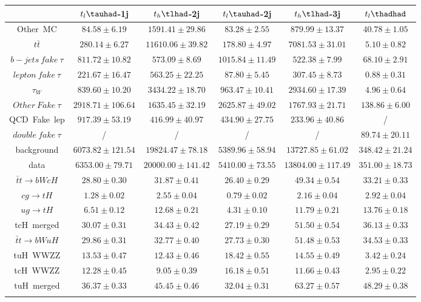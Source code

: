 \centering
\begin{tabular}{cccccc} \toprule\toprule
 & $t_{l}\tauhad$-1j & $t_{h}\tlhad$-2j & $t_{l}\tauhad$-2j & $t_{h}\tlhad$-3j & $t_{l}\thadhad$\\\midrule
Other~MC & $84.58\pm6.19$ & $1591.41\pm29.86$ & $83.28\pm2.55$ & $879.99\pm13.37$ & $40.78\pm1.05$\\
$t\bar{t}$ & $280.14\pm6.27$ & $11610.06\pm39.82$ & $178.80\pm4.97$ & $7081.53\pm31.01$ & $5.10\pm0.82$\\
$b-jets~fake~\tau$ & $811.72\pm10.82$ & $573.09\pm8.69$ & $1015.84\pm11.49$ & $522.38\pm7.99$ & $68.10\pm2.91$\\
$lepton~fake~\tau$ & $221.67\pm16.47$ & $563.25\pm22.25$ & $87.80\pm5.45$ & $307.45\pm8.73$ & $0.88\pm0.31$\\
$\tau_{W}$ & $839.60\pm10.20$ & $3434.22\pm18.70$ & $963.47\pm10.41$ & $2934.60\pm17.39$ & $4.96\pm0.64$\\
$Other~Fake~\tau$ & $2918.71\pm106.64$ & $1635.45\pm32.19$ & $2625.87\pm49.02$ & $1767.93\pm21.71$ & $138.86\pm6.00$\\
QCD~Fake~lep & $917.39\pm53.19$ & $416.99\pm40.97$ & $434.90\pm27.75$ & $233.96\pm40.86$ &  /\\
$double~fake~\tau$ &  / &  / &  / &  / & $89.74\pm20.11$\\
background & $6073.82\pm121.54$ & $19824.47\pm78.18$ & $5389.96\pm58.94$ & $13727.85\pm61.02$ & $348.42\pm21.24$\\
data & $6353.00\pm79.71$ & $20000.00\pm141.42$ & $5410.00\pm73.55$ & $13804.00\pm117.49$ & $351.00\pm18.73$\\
$\bar{t}t\to bWcH$ & $28.80\pm0.30$ & $31.87\pm0.41$ & $26.40\pm0.29$ & $49.34\pm0.54$ & $33.21\pm0.33$\\
$cg\to tH$ & $1.28\pm0.02$ & $2.55\pm0.04$ & $0.79\pm0.02$ & $2.16\pm0.04$ & $2.92\pm0.04$\\
$ug\to tH$ & $6.51\pm0.12$ & $12.68\pm0.21$ & $4.31\pm0.10$ & $11.79\pm0.21$ & $13.76\pm0.18$\\
tcH~merged & $30.07\pm0.31$ & $34.43\pm0.42$ & $27.19\pm0.29$ & $51.50\pm0.54$ & $36.13\pm0.33$\\
$\bar{t}t\to bWuH$ & $29.86\pm0.31$ & $32.77\pm0.40$ & $27.73\pm0.30$ & $51.48\pm0.53$ & $34.53\pm0.33$\\
tuH~WWZZ & $13.53\pm0.47$ & $12.43\pm0.46$ & $18.42\pm0.55$ & $14.55\pm0.49$ & $3.42\pm0.24$\\
tcH~WWZZ & $12.28\pm0.45$ & $9.05\pm0.39$ & $16.18\pm0.51$ & $11.66\pm0.43$ & $2.95\pm0.22$\\
tuH~merged & $36.37\pm0.33$ & $45.45\pm0.46$ & $32.04\pm0.31$ & $63.27\pm0.57$ & $48.29\pm0.38$\\
\bottomrule\bottomrule\\
\end{tabular}
